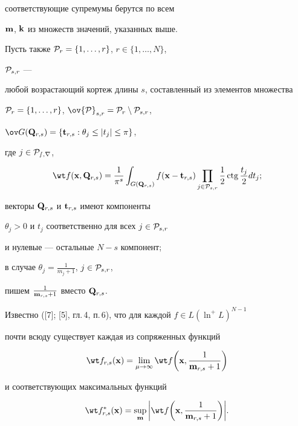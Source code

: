 соответствующие супремумы берутся по всем 


${\bold m}$, ${\bold k}$ из множеств значений, указанных выше.


Пусть также ${\cal P}_r=\{1,\dotsc,r\}$, $r\in\{1,\dotsc,N\}$,


${\cal P}_{s,r}$ ---


любой возрастающий кортеж длины $s$, составленный из элементов множества


${\cal P}_r=\{1,\dotsc,r\}$, $\ov{\cal P}_{s,r}={\cal P}_r


\setminus {\cal P}_{s,r}$,


$\ov G({\bold Q}_{r,s})=\{{\bold t}_{r,s}: \theta_j\le|t_j|\le\pi\}$,


где $j\in\cal P_{s,r}$,


$$


\wt f ({\bold x},{\bold Q}_{r,s})=\frac{1}{\pi^s}\int_{ G({\bold Q}_{r,s})}


f ({\bold x}-{\bold t}_{r,s})


\prod_{j\in {\cal P}_{s,r}} \frac{1}{2} \ctg\frac{t_j}{2}dt_j;


$$


векторы ${\bold Q}_{r,s}$ и ${\bold t}_{r,s}$ имеют компоненты


$\theta_j>0$ и $t_j$ соответственно для всех $j\in {\cal P}_{s,r}$


и нулевые --- остальные $N-s$ компонент\/;


в случае $\theta_j=\frac{1}{m_j+1}$, $j\in {\cal P}_{s,r}$,


пишем $\frac{1}{{\bold m}_{r,s}+1}$ вместо ${\bold Q}_{r,s}$. 


Известно ([7]; [5], гл.\,4, п.\,6), что для каждой $f\in L(\ln^+L)^{N-1}$


почти всюду существует каждая из сопряженных функций


\begin{equation*}


\wt f_{r,s} ({\bold x} )=\lim_{\mu\to\infty}


\wt f \bigg({\bold x},\frac{1}{{\bold m}_{r,s}+1}\bigg)


\end{equation*}


и соответствующих максимальных функций


\begin{equation}


\wt f_{r,s}^* ({\bold x} )=\sup_{\bold m}


\bigg|\wt f \bigg({\bold x},\frac{1}{{\bold m}_{r,s}+1}\bigg)\bigg|.


\end{equation}






